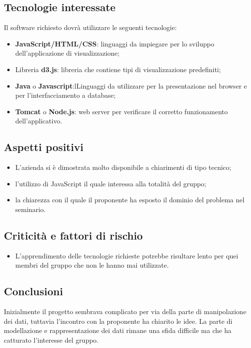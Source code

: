 \subsection{Tecnologie interessate}
Il software richiesto dovrà utilizzare le seguenti tecnologie:
\begin{itemize}
	\item \textbf{JavaScript/HTML/CSS}: linguaggi da impiegare per lo sviluppo dell'applicazione di visualizzazione;
	\item Libreria \textbf{d3.js}: libreria che contiene tipi di visualizzazione predefiniti;
	\item \textbf{Java} o \textbf{Javascript}:lLinguaggi da utilizzare per la presentazione nel browser e per l'interfacciamento a database;
	\item \textbf{Tomcat} o \textbf{Node.js}: web server per verificare il corretto funzionamento dell'applicativo.
\end{itemize}
\subsection{Aspetti positivi}
\begin{itemize}
	\item L'azienda si è dimostrata molto disponibile a chiarimenti di tipo tecnico;
	\item l'utilizzo di JavaScript il quale interessa alla totalità del gruppo;
	\item la chiarezza con il quale il proponente ha esposto il dominio del problema nel seminario.
\end{itemize}
\subsection{Criticità e fattori di rischio}
\begin{itemize}
	\item L'apprendimento delle tecnologie richieste potrebbe risultare lento per quei membri del gruppo che non le hanno mai utilizzate.
\end{itemize}
\subsection{Conclusioni}
Inizialmente il progetto sembrava complicato per via della parte di manipolazione dei dati, tuttavia l'incontro con la proponente ha chiarito le idee. La parte di modellazione e rappresentazione dei dati rimane una sfida difficile ma che ha catturato l'interesse del gruppo.